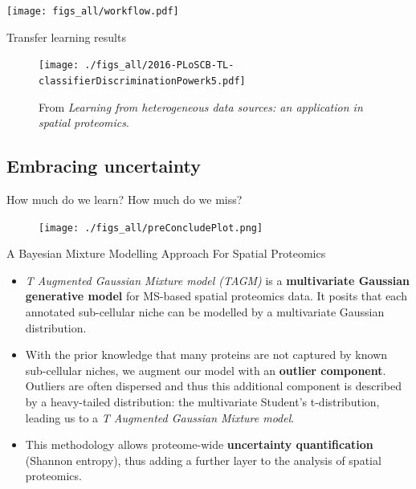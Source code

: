 \begin{frame}
  \begin{center}
    \texttt{[image: figs\_all/workflow.pdf]}
  \end{center}
\end{frame}


\begin{frame}{Transfer learning results}

  \begin{figure}[h]
    \centering
    \texttt{[image: ./figs\_all/2016-PLoSCB-TL-classifierDiscriminationPowerk5.pdf]}
    \caption{{\footnotesize From \cite{Breckels:2016} \textit{Learning from
          heterogeneous data sources: an application in spatial
          proteomics}.}
    }
\label{fig:tlres}
  \end{figure}

\end{frame}

\subsection{Embracing uncertainty}

\begin{frame}{How much do we learn? How much do we miss?}
  \begin{figure}
    \texttt{[image: ./figs\_all/preConcludePlot.png]}
  \end{figure}
\end{frame}


\begin{frame}{A Bayesian Mixture Modelling Approach For Spatial Proteomics}

  \begin{itemize}

    \item<+-> \textit{T Augmented Gaussian Mixture model (TAGM)} is a
      \textbf{multivariate Gaussian generative model} for MS-based
      spatial proteomics data. It posits that each annotated
      sub-cellular niche can be modelled by a multivariate Gaussian
      distribution.

    \item<+-> With the prior knowledge that many proteins are not
      captured by known sub-cellular niches, we augment our model with
      an \textbf{outlier component}. Outliers are often dispersed and
      thus this additional component is described by a heavy-tailed
      distribution: the multivariate Student's t-distribution, leading
      us to a \textit{T Augmented Gaussian Mixture model}.

    \item<+-> This methodology allows proteome-wide
      \textbf{uncertainty quantification} (Shannon entropy), thus
      adding a further layer to the analysis of spatial proteomics.

  \end{itemize}
\end{frame}

